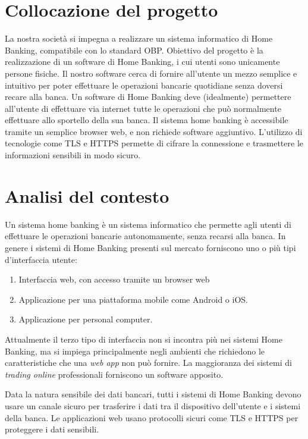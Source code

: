 \documentclass[10pt]{softeng} %
\begin{document}
\startofdocument{}

\section{Collocazione del progetto}

La nostra societ\`a si impegna a realizzare un sistema informatico di Home Banking, compatibile con lo standard OBP.
Obiettivo del progetto \`e la realizzazione di un software di Home Banking, i cui utenti sono unicamente persone fisiche.
Il nostro software cerca di fornire all'utente un mezzo semplice e intuitivo per poter effettuare le operazioni bancarie quotidiane senza doversi recare alla banca.
Un software di Home Banking deve (idealmente) permettere all'utente di effettuare via internet tutte le operazioni che pu\`o normalmente effettuare allo sportello della sua banca.
Il sistema home banking \`e accessibile tramite un semplice browser web, e non richiede software aggiuntivo.
L'utilizzo di tecnologie come TLS e HTTPS permette di cifrare la connessione e trasmettere le informazioni sensibili in modo sicuro.


\section{Analisi del contesto}
Un sistema home banking \`e un sistema informatico che permette agli utenti di effettuare le operazioni bancarie autonomamente, senza recarsi alla banca.
In genere i sistemi di Home Banking presenti sul mercato forniscono uno o pi\`u tipi d'interfaccia utente:
\begin{enumerate}
    \item Interfaccia web, con accesso tramite un browser web
    \item Applicazione per una piattaforma mobile come Android o iOS.
    \item Applicazione per personal computer.
\end{enumerate}
Attualmente il terzo tipo di interfaccia non si incontra pi\`u nei sistemi Home Banking, ma si impiega principalmente negli ambienti che richiedono le caratteristiche che una \emph{web app} non pu\`o fornire.
La maggioranza dei sistemi di \emph{trading online} professionali forniscono un software apposito.


Data la natura sensibile dei dati bancari, tutti i sistemi di Home Banking devono usare un canale sicuro per trasferire i dati tra il dispositivo dell'utente e i sistemi della banca.
Le applicazioni web usano protocolli sicuri come TLS e HTTPS per proteggere i dati sensibili.
\end{document}
